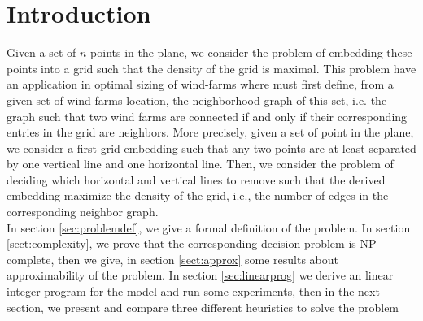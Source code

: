 \section{Introduction}
\label{sect:intro}


Given a set of $n$ points in the plane, we consider the problem of embedding these points into a grid such that the density of the grid is maximal. This problem have an application in optimal sizing of wind-farms \cite{pillai} where must first define, from a given set of  wind-farms location, the neighborhood graph of this set, i.e. the graph such that two wind farms are connected if and only if their corresponding entries in the grid are neighbors. More precisely, given a set of point in the plane, we consider a first grid-embedding such that any two points are at least separated by one vertical line and one horizontal line. Then, we consider the problem of deciding which horizontal and vertical lines to remove such that the derived embedding maximize the density of the grid, i.e., the number of edges in the corresponding neighbor graph.\\
In section \ref{sec:problemdef}, we give a formal definition of the problem. In section \ref{sect:complexity}, we prove that the corresponding decision problem is NP-complete, then we give, in section \ref{sect:approx} some results about approximability of the problem. In section \ref{sec:linearprog} we derive an linear integer program for the model and run some experiments, then in the next section, we present and compare three different heuristics to solve the problem
